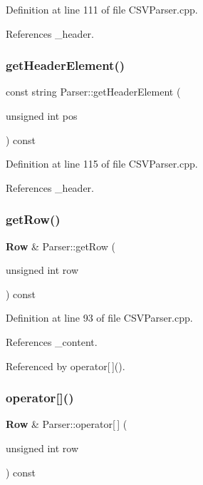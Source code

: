 Definition at line 111 of file C\+S\+V\+Parser.\+cpp.



References \+\_\+header.

\mbox{\label{class_parser_adff671135239b5031b8eb937eb9cd844}} 
\subsubsection{get\+Header\+Element()}
{\footnotesize\ttfamily const string Parser\+::get\+Header\+Element (\begin{DoxyParamCaption}\item[{unsigned int}]{pos }\end{DoxyParamCaption}) const}



Definition at line 115 of file C\+S\+V\+Parser.\+cpp.



References \+\_\+header.

\mbox{\label{class_parser_a4cbc7632e6bb4841275884cbc128e25a}} 
\subsubsection{get\+Row()}
{\footnotesize\ttfamily \textbf{ Row} \& Parser\+::get\+Row (\begin{DoxyParamCaption}\item[{unsigned int}]{row }\end{DoxyParamCaption}) const}



Definition at line 93 of file C\+S\+V\+Parser.\+cpp.



References \+\_\+content.



Referenced by operator[$\,$]().

\mbox{\label{class_parser_a9c29df2f64942cac1dcc1f5d63b4fb36}} 
\subsubsection{operator[]()}
{\footnotesize\ttfamily \textbf{ Row} \& Parser\+::operator[$\,$] (\begin{DoxyParamCaption}\item[{unsigned int}]{row }\end{DoxyParamCaption}) const}



